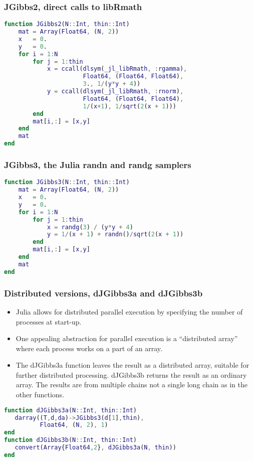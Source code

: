 \documentclass[dvipsnames,pdflatex,beamer]{beamer}
\makeatletter
\newcommand\code{\bgroup\@codex}
\def\@codex#1{{\normalfont\ttfamily\hyphenchar\font=-1 #1}\egroup}
\makeatother
\begin{document}
\begin{frame}[fragile]
  \frametitle{JGibbs2, direct calls to libRmath}
\begin{lstlisting}[language=Matlab]
function JGibbs2(N::Int, thin::Int)
    mat = Array(Float64, (N, 2))
    x   = 0.
    y   = 0.
    for i = 1:N
        for j = 1:thin
            x = ccall(dlsym(_jl_libRmath, :rgamma),
                      Float64, (Float64, Float64),
                      3., 1/(y*y + 4))
            y = ccall(dlsym(_jl_libRmath, :rnorm),
                      Float64, (Float64, Float64), 
                      1/(x+1), 1/sqrt(2(x + 1)))
        end
        mat[i,:] = [x,y]
    end
    mat
end
\end{lstlisting}
\end{frame}
\begin{frame}[fragile]
  \frametitle{JGibbs3, the Julia randn and randg samplers}
\begin{lstlisting}[language=Matlab]
function JGibbs3(N::Int, thin::Int)
    mat = Array(Float64, (N, 2))
    x   = 0.
    y   = 0.
    for i = 1:N
        for j = 1:thin
            x = randg(3) / (y*y + 4)
            y = 1/(x + 1) + randn()/sqrt(2(x + 1))
        end
        mat[i,:] = [x,y]
    end
    mat
end
\end{lstlisting}
\end{frame}
\begin{frame}[fragile]
  \frametitle{Distributed versions, dJGibbs3a and dJGibbs3b}
  \begin{itemize}
  \item Julia allows for distributed parallel execution by specifying
    the number of processes at start-up.
  \item One appealing abstraction for parallel execution is a
    ``distributed array'' where each process works on a part of an
    array.
  \item The \code{dJGibbs3a} function leaves the result as a
    distributed array, suitable for further distributed
    processing. \code{dJGibbs3b} returns the result as an ordinary
    array.  The results are from multiple chains not a single long
    chain as in the other functions.
  \end{itemize}
\begin{lstlisting}[language=Matlab]
function dJGibbs3a(N::Int, thin::Int)
   darray((T,d,da)->JGibbs3(d[1],thin), 
          Float64, (N, 2), 1)
end
function dJGibbs3b(N::Int, thin::Int)
   convert(Array{Float64,2}, dJGibbs3a(N, thin))
end
\end{lstlisting}
\end{frame}
\end{document}
